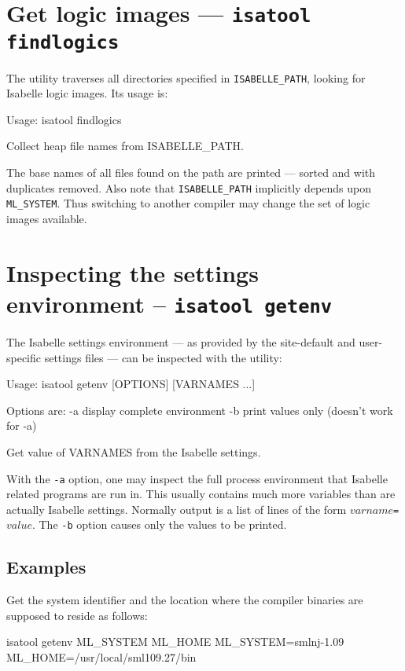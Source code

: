 \section{Get logic images --- \texttt{isatool findlogics}}

The  utility traverses all directories specified in
\texttt{ISABELLE_PATH}, looking for Isabelle logic images. Its usage
is:
\begin{ttbox}
Usage: isatool findlogics

  Collect heap file names from ISABELLE_PATH.
\end{ttbox}
The base names of all files found on the path are printed --- sorted
and with duplicates removed. Also note that \texttt{ISABELLE_PATH}
implicitly depends upon \texttt{ML_SYSTEM}. Thus switching to another
{\ML} compiler may change the set of logic images available.


\section{Inspecting the settings environment -- \texttt{isatool getenv}}
\label{sec:tool-getenv}

The Isabelle settings environment --- as provided by the site-default
and user-specific settings files --- can be inspected with the
 utility:
\begin{ttbox}
Usage: isatool getenv [OPTIONS] [VARNAMES ...]

  Options are:
    -a           display complete environment
    -b           print values only (doesn't work for -a)

  Get value of VARNAMES from the Isabelle settings.
\end{ttbox}

With the \texttt{-a} option, one may inspect the full process
environment that Isabelle related programs are run in. This usually
contains much more variables than are actually Isabelle settings.
Normally output is a list of lines of the form
\mbox{$varname$\texttt{=}$value$}. The \texttt{-b} option causes only
the values to be printed.


\subsection*{Examples}

Get the {\ML} system identifier and the location where the compiler
binaries are supposed to reside as follows:
\begin{ttbox}
isatool getenv ML_SYSTEM ML_HOME
{\out ML_SYSTEM=smlnj-1.09}
{\out ML_HOME=/usr/local/sml109.27/bin}
\end{ttbox}


